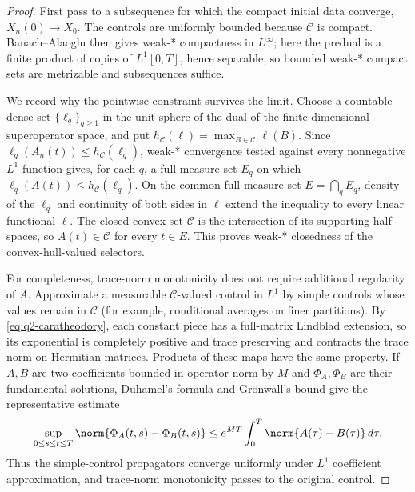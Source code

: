 \documentclass[class=article,11pt,a4paper,crop=false]{standalone}
\begin{document}
\begin{proof}
First pass to a subsequence for which the compact initial data converge,
$X_n(0)\to X_0$. The controls are uniformly bounded because $\mathcal C$ is
compact. Banach--Alaoglu then gives weak-* compactness in $L^\infty$; here the
predual is a finite product of copies of $L^1[0,T]$, hence separable, so bounded
weak-* compact sets are metrizable and subsequences suffice.

We record why the pointwise constraint survives the limit. Choose a countable
dense set $\{\ell_q\}_{q\ge1}$ in the unit sphere of the dual of the
finite-dimensional superoperator space, and put
$h_{\mathcal C}(\ell)=\max_{B\in\mathcal C}\ell(B)$. Since
$\ell_q(A_n(t))\le h_{\mathcal C}(\ell_q)$, weak-* convergence tested against
every nonnegative $L^1$ function gives, for each $q$, a full-measure set $E_q$
on which $\ell_q(A(t))\le h_{\mathcal C}(\ell_q)$. On the common full-measure
set $E=\bigcap_qE_q$, density of the $\ell_q$ and continuity of both sides in
$\ell$ extend the inequality to every linear functional $\ell$. The closed
convex set $\mathcal C$ is the intersection of its supporting half-spaces, so
$A(t)\in\mathcal C$ for every $t\in E$. This proves weak-* closedness of the
convex-hull-valued selectors.

For completeness, trace-norm monotonicity does not require additional
regularity of $A$. Approximate a measurable $\mathcal C$-valued control in
$L^1$ by simple controls whose values remain in $\mathcal C$ (for example,
conditional averages on finer partitions). By
\eqref{eq:q2-caratheodory}, each constant piece has a full-matrix Lindblad
extension, so its exponential is completely positive and trace preserving and
contracts the trace norm on Hermitian matrices. Products of these maps have
the same property. If $A,B$ are two coefficients bounded in operator norm by
$M$ and $\Phi_A,\Phi_B$ are their fundamental solutions, Duhamel's formula and
Gr\"onwall's bound give the representative estimate
\begin{equation}
 \sup_{0\le s\le t\le T}\norm{\Phi_A(t,s)-\Phi_B(t,s)}
 \le e^{MT}\int_0^T\norm{A(\tau)-B(\tau)}\,d\tau.
 \label{eq:q2-duhamel-estimate}
\end{equation}
Thus the simple-control propagators converge uniformly under $L^1$
coefficient approximation, and trace-norm monotonicity passes to the original
control.


\end{proof}
\end{document}
